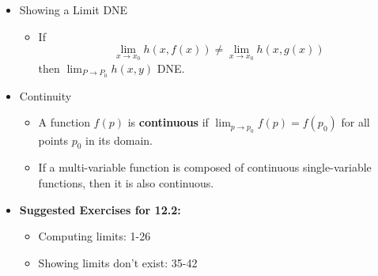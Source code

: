 \documentclass[12pt]{article}
\newcommand{\ds}{\displaystyle}
\newcommand{\<}{\left<}
\renewcommand{\>}{\right>}
\begin{document}
\begin{itemize}
    \item Showing a Limit DNE
    
      \begin{itemize}
        \item If
          \[
            \lim_{x\to x_0} h(x,f(x)) \not= \lim_{x\to x_0} h(x,g(x))
          \]
          then $\ds\lim_{P\to P_0} h(x,y)$ DNE.
      \end{itemize}
    
    \item Continuity
    
      \begin{itemize}
        \item A function $f(p)$ is \textbf{continuous} if $\ds \lim_{p\to p_0}f(p) = f(p_0)$ for all points $p_0$ in its domain.
        \item If a multi-variable function is composed of continuous single-variable functions, then it is also continuous.
      \end{itemize}
    
    \item \textbf{ Suggested Exercises for 12.2:}
    
      \begin{itemize}
      \item Computing limits: 1-26
      \item Showing limits don't exist: 35-42
      \end{itemize}
  
  \end{itemize}
  
  
  
  
  
  
\end{document}
